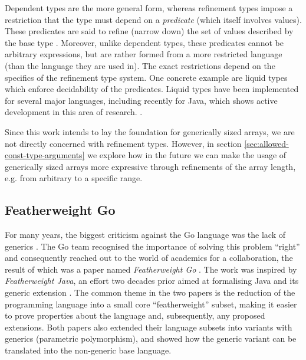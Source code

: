 


Dependent types are the more general form, whereas refinement types impose a
restriction that the type must depend on a \emph{predicate} (which itself
involves values). These predicates are said to refine (narrow down) the set of
values described by the base type \autocite{refinement}. Moreover, unlike
dependent types, these predicates cannot be arbitrary expressions, but are
rather formed from a more restricted language (than the language they are used
in). The exact restrictions depend on the specifics of the refinement type
system. One concrete example are liquid types which enforce decidability of the
predicates. Liquid types have been implemented for several major languages,
including recently for Java, which shows active development in this area of
research. \autocites{liquidTypesBlog}{liquidJava}.

Since this work intends to lay the foundation for generically sized arrays, we
are not directly concerned with refinement types. However, in section
\ref{sec:allowed-const-type-arguments} we explore how in the
future we can make the usage of generically sized arrays more expressive through
refinements of the array length, e.g. from arbitrary to a specific range.

\subsection{Featherweight Go}

For many years, the biggest criticism against the Go language was the lack of
generics \autocites{survey2021}{survey2020}{survey2019}. The Go team recognised
the importance of solving this problem ``right'' and consequently reached out to
the world of academics for a collaboration, the result of which was a paper
named \emph{Featherweight Go} \autocite{fg}. The work was inspired by
\emph{Featherweight Java}, an effort two decades prior aimed at formalising Java
and its generic extension \autocite{fj}. The common theme in the two papers is
the reduction of the programming language into a small core ``featherweight''
subset, making it easier to prove properties about the language and,
subsequently, any proposed extensions.
Both papers also extended their language subsets into variants with generics
(parametric polymorphism), and showed how the generic variant can be translated
into the non-generic base language.

